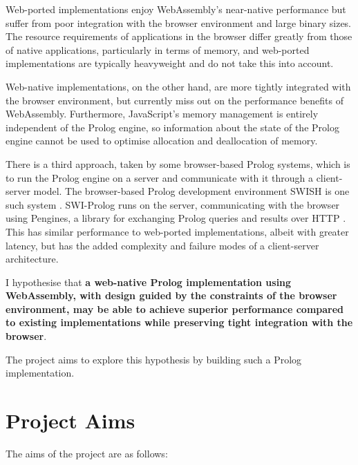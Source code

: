 Web-ported implementations enjoy WebAssembly's near-native performance but suffer from poor integration with the browser environment and large binary sizes. The resource requirements of applications in the browser differ greatly from those of native applications, particularly in terms of memory, and web-ported implementations are typically heavyweight and do not take this into account.

Web-native implementations, on the other hand, are more tightly integrated with the browser environment, but currently miss out on the performance benefits of WebAssembly. Furthermore, JavaScript's memory management is entirely independent of the Prolog engine, so information about the state of the Prolog engine cannot be used to optimise allocation and deallocation of memory.

There is a third approach, taken by some browser-based Prolog systems, which is to run the Prolog engine on a server and communicate with it through a client-server model. The browser-based Prolog development environment SWISH is one such system \cite{wielemakerSWISHSWIPrologSharing2015}. SWI-Prolog runs on the server, communicating with the browser using Pengines, a library for exchanging Prolog queries and results over HTTP \cite{lagerPenginesWebLogic2014}. This has similar performance to web-ported implementations, albeit with greater latency, but has the added complexity and failure modes of a client-server architecture.

I hypothesise that \textbf{a web-native Prolog implementation using WebAssembly, with design guided by the constraints of the browser environment, may be able to achieve superior performance compared to existing implementations while preserving tight integration with the browser}.

The project aims to explore this hypothesis by building such a Prolog implementation.

\section{Project Aims}

The aims of the project are as follows:

